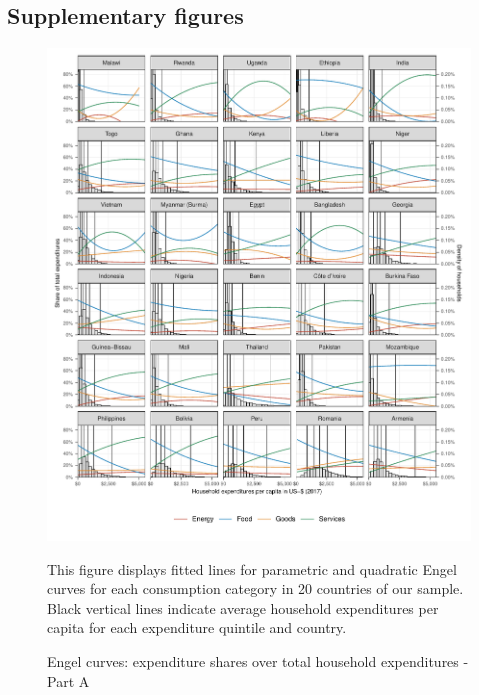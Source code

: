 \documentclass[12pt, a4paper]{article}
\newenvironment{subcaption}
{\strut
\vspace{-5pt}
\begin{minipage}[b]{0.9\textwidth}
  \hspace*{-\parindent}
  \footnotesize}
 {\end{minipage}}
\begin{document}
\clearpage

\renewcommand\thefigure{\thesection.\arabic{figure}}
\renewcommand\thetable{\thesection.\arabic{table}}
\setcounter{figure}{0}
\setcounter{table}{0}

\subsection{Supplementary figures} \label{sec:figures}

\begin{figure}[ht!]
  \centering
  \caption{Engel curves: expenditure shares over total household expenditures - Part A} \label{fig:A1}
  \includegraphics{Analysis_Parametric_Engel_Curves/Parametric_EC_0_A}
  \begin{subcaption}
    This figure displays fitted lines for parametric and quadratic Engel curves for each consumption category in 20 countries of our sample. Black vertical lines indicate average household expenditures per capita for each expenditure quintile and country.
  \end{subcaption}

\end{figure}
\end{document}
